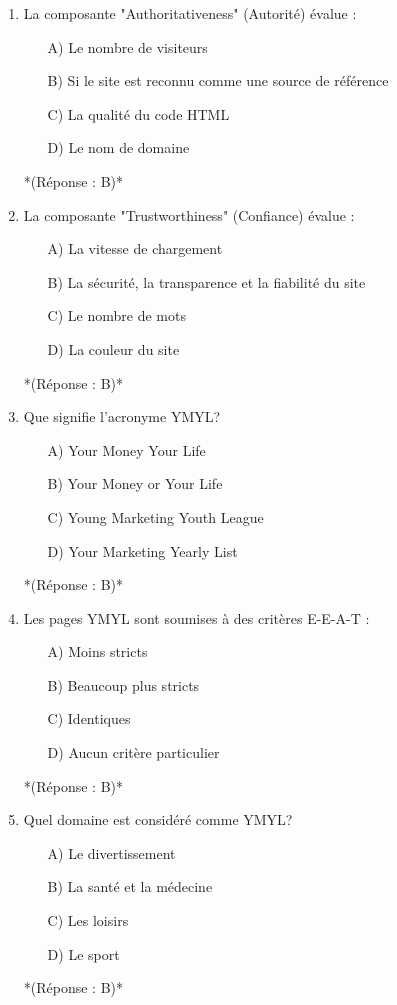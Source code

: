 \documentclass[12pt,a4paper,twoside]{report}
\begin{document}
\begin{enumerate}
\item La composante "Authoritativeness" (Autorité) évalue :
\begin{itemize}
\item[A)] Le nombre de visiteurs
\item[B)] Si le site est reconnu comme une source de référence
\item[C)] La qualité du code HTML
\item[D)] Le nom de domaine
\end{itemize}
*(Réponse : B)*

\item La composante "Trustworthiness" (Confiance) évalue :
\begin{itemize}
\item[A)] La vitesse de chargement
\item[B)] La sécurité, la transparence et la fiabilité du site
\item[C)] Le nombre de mots
\item[D)] La couleur du site
\end{itemize}
*(Réponse : B)*

\item Que signifie l'acronyme YMYL?
\begin{itemize}
\item[A)] Your Money Your Life
\item[B)] Your Money or Your Life
\item[C)] Young Marketing Youth League
\item[D)] Your Marketing Yearly List
\end{itemize}
*(Réponse : B)*

\item Les pages YMYL sont soumises à des critères E-E-A-T :
\begin{itemize}
\item[A)] Moins stricts
\item[B)] Beaucoup plus stricts
\item[C)] Identiques
\item[D)] Aucun critère particulier
\end{itemize}
*(Réponse : B)*

\item Quel domaine est considéré comme YMYL?
\begin{itemize}
\item[A)] Le divertissement
\item[B)] La santé et la médecine
\item[C)] Les loisirs
\item[D)] Le sport
\end{itemize}
*(Réponse : B)*


\end{enumerate}
\end{document}
